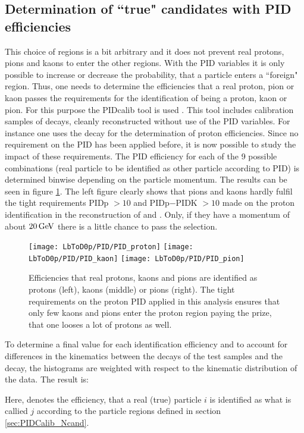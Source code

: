 \subsection{Determination of ``true" candidates with PID efficiencies}
This choice of regions is a bit arbitrary and it does not prevent real protons, pions and kaons to enter the other regions.
With the PID variables it is only possible to increase or decrease the probability, that a particle enters a ``foreign" region.
Thus, one needs to determine the efficiencies that a real proton, pion or kaon passes the requirements for the identification of being a proton, kaon or pion.
For this purpose the \lhcb PIDcalib tool is used \cite{PIDcalib}.
This tool includes calibration samples of decays, cleanly reconstructed without use of the PID variables. 
For instance one uses the decay \decay{\Lambda}{\proton\pim} for the determination of proton efficiencies.
Since no requirement on the PID has been applied before, it is now possible to study the impact of these requirements.
The PID efficiency for each of the 9 possible combinations (real particle to be identified as other particle according to PID) is determined binwise depending on the particle momentum. 
The results can be seen in figure \ref{fig:PIDefficiencies}.
The left figure clearly shows that pions and kaons hardly fulfil the tight requirements PIDp $>10$ and PIDp$-$PIDK $>10$ made on the proton identification in the reconstruction of \LbToDpmunuX and \LbToLcmunu.
Only, if they have a momentum of about $20 \mathrm{\,Ge\kern -0.1em V}$ there is a little chance to pass the selection.
\begin{figure}[ptb]
	\centering
	\texttt{[image: LbToD0p/PID/PID\_proton]}
	\texttt{[image: LbToD0p/PID/PID\_kaon]}
	\texttt{[image: LbToD0p/PID/PID\_pion]}
	\caption{Efficiencies that real protons, kaons and pions are identified as protons (left), kaons (middle) or pions (right). The tight requirements on the proton PID applied in this analysis ensures that only few kaons and pions enter the proton region paying the prize, that one looses a lot of
    protons as well.}
	\label{fig:PIDefficiencies}
\end{figure}
To determine a final value for each identification efficiency and to account for differences in the kinematics between the decays of the test samples and the \LbToDpmunuX decay, the histograms are weighted with respect to the kinematic distribution of the \LbToDpmunuX data.
The result is:

Here,  denotes the efficiency, that a real (true) particle $i$ is identified as what is callied $j$ according to the particle regions defined in section \ref{sec:PIDCalib_Ncand}. 
